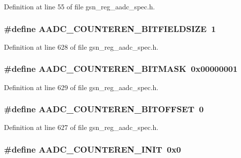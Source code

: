 Definition at line 55 of file gsn\_\-reg\_\-aadc\_\-spec.h.

\hypertarget{a00543_ac29ea1baf637fdb69a214e589dfc8e3a}{
\subsubsection[{AADC\_\-COUNTEREN\_\-BITFIELDSIZE}]{\setlength{\rightskip}{0pt plus 5cm}\#define AADC\_\-COUNTEREN\_\-BITFIELDSIZE~1}}
\label{a00543_ac29ea1baf637fdb69a214e589dfc8e3a}


Definition at line 628 of file gsn\_\-reg\_\-aadc\_\-spec.h.

\hypertarget{a00543_aba36dbae7aa279c953c5eac60cefb035}{
\subsubsection[{AADC\_\-COUNTEREN\_\-BITMASK}]{\setlength{\rightskip}{0pt plus 5cm}\#define AADC\_\-COUNTEREN\_\-BITMASK~0x00000001}}
\label{a00543_aba36dbae7aa279c953c5eac60cefb035}


Definition at line 629 of file gsn\_\-reg\_\-aadc\_\-spec.h.

\hypertarget{a00543_a80153af03a92eae6fbad0c1b7ffa7bbd}{
\subsubsection[{AADC\_\-COUNTEREN\_\-BITOFFSET}]{\setlength{\rightskip}{0pt plus 5cm}\#define AADC\_\-COUNTEREN\_\-BITOFFSET~0}}
\label{a00543_a80153af03a92eae6fbad0c1b7ffa7bbd}


Definition at line 627 of file gsn\_\-reg\_\-aadc\_\-spec.h.

\hypertarget{a00543_ade2e7d1d44a1be66e0409d75420062b3}{
\subsubsection[{AADC\_\-COUNTEREN\_\-INIT}]{\setlength{\rightskip}{0pt plus 5cm}\#define AADC\_\-COUNTEREN\_\-INIT~0x0}}
\label{a00543_ade2e7d1d44a1be66e0409d75420062b3}


